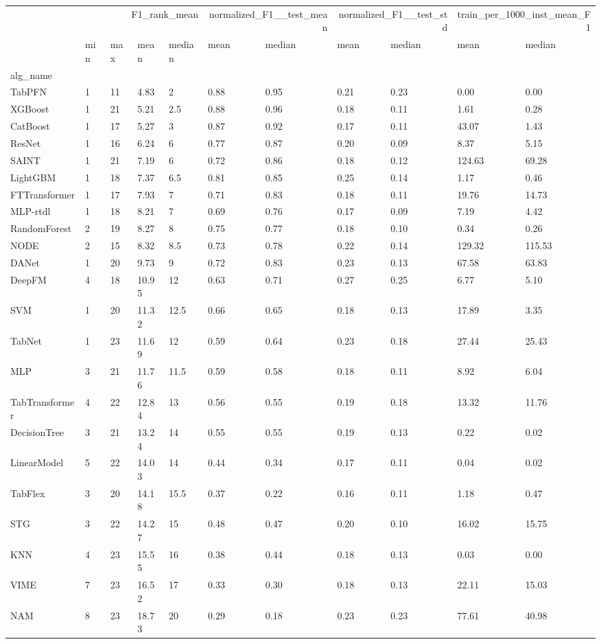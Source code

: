 \begin{tabular}{lllllllllll}
\toprule
 & \multicolumn{4}{r}{F1_rank_mean} & \multicolumn{2}{r}{normalized_F1__test_mean} & \multicolumn{2}{r}{normalized_F1__test_std} & \multicolumn{2}{r}{train_per_1000_inst_mean_F1} \\
 & min & max & mean & median & mean & median & mean & median & mean & median \\
alg_name &  &  &  &  &  &  &  &  &  &  \\
\midrule
TabPFN & 1 & 11 & 4.83 & 2 & 0.88 & 0.95 & 0.21 & 0.23 & 0.00 & 0.00 \\
XGBoost & 1 & 21 & 5.21 & 2.5 & 0.88 & 0.96 & 0.18 & 0.11 & 1.61 & 0.28 \\
CatBoost & 1 & 17 & 5.27 & 3 & 0.87 & 0.92 & 0.17 & 0.11 & 43.07 & 1.43 \\
ResNet & 1 & 16 & 6.24 & 6 & 0.77 & 0.87 & 0.20 & 0.09 & 8.37 & 5.15 \\
SAINT & 1 & 21 & 7.19 & 6 & 0.72 & 0.86 & 0.18 & 0.12 & 124.63 & 69.28 \\
LightGBM & 1 & 18 & 7.37 & 6.5 & 0.81 & 0.85 & 0.25 & 0.14 & 1.17 & 0.46 \\
FTTransformer & 1 & 17 & 7.93 & 7 & 0.71 & 0.83 & 0.18 & 0.11 & 19.76 & 14.73 \\
MLP-rtdl & 1 & 18 & 8.21 & 7 & 0.69 & 0.76 & 0.17 & 0.09 & 7.19 & 4.42 \\
RandomForest & 2 & 19 & 8.27 & 8 & 0.75 & 0.77 & 0.18 & 0.10 & 0.34 & 0.26 \\
NODE & 2 & 15 & 8.32 & 8.5 & 0.73 & 0.78 & 0.22 & 0.14 & 129.32 & 115.53 \\
DANet & 1 & 20 & 9.73 & 9 & 0.72 & 0.83 & 0.23 & 0.13 & 67.58 & 63.83 \\
DeepFM & 4 & 18 & 10.95 & 12 & 0.63 & 0.71 & 0.27 & 0.25 & 6.77 & 5.10 \\
SVM & 1 & 20 & 11.32 & 12.5 & 0.66 & 0.65 & 0.18 & 0.13 & 17.89 & 3.35 \\
TabNet & 1 & 23 & 11.69 & 12 & 0.59 & 0.64 & 0.23 & 0.18 & 27.44 & 25.43 \\
MLP & 3 & 21 & 11.76 & 11.5 & 0.59 & 0.58 & 0.18 & 0.11 & 8.92 & 6.04 \\
TabTransformer & 4 & 22 & 12.84 & 13 & 0.56 & 0.55 & 0.19 & 0.18 & 13.32 & 11.76 \\
DecisionTree & 3 & 21 & 13.24 & 14 & 0.55 & 0.55 & 0.19 & 0.13 & 0.22 & 0.02 \\
LinearModel & 5 & 22 & 14.03 & 14 & 0.44 & 0.34 & 0.17 & 0.11 & 0.04 & 0.02 \\
TabFlex & 3 & 20 & 14.18 & 15.5 & 0.37 & 0.22 & 0.16 & 0.11 & 1.18 & 0.47 \\
STG & 3 & 22 & 14.27 & 15 & 0.48 & 0.47 & 0.20 & 0.10 & 16.02 & 15.75 \\
KNN & 4 & 23 & 15.55 & 16 & 0.38 & 0.44 & 0.18 & 0.13 & 0.03 & 0.00 \\
VIME & 7 & 23 & 16.52 & 17 & 0.33 & 0.30 & 0.18 & 0.13 & 22.11 & 15.03 \\
NAM & 8 & 23 & 18.73 & 20 & 0.29 & 0.18 & 0.23 & 0.23 & 77.61 & 40.98 \\
\bottomrule
\end{tabular}
